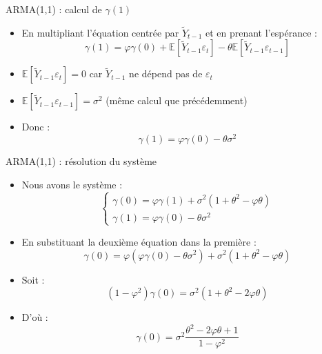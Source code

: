 \documentclass[11pt,aspectratio=169]{beamer}
\newcommand{\E}{\mathbb{E}}
\begin{document}
\begin{frame}{ARMA(1,1) : calcul de $\gamma(1)$}

\begin{itemize}

\item En multipliant l'équation centrée par $\tilde{Y}_{t-1}$ et en prenant l'espérance :
\[
\gamma(1) = \varphi \gamma(0) + \E[\tilde{Y}_{t-1} \varepsilon_t] - \theta \E[\tilde{Y}_{t-1} \varepsilon_{t-1}]
\]

\item $\E[\tilde{Y}_{t-1} \varepsilon_t] = 0$ car $\tilde{Y}_{t-1}$ ne dépend pas de $\varepsilon_t$\newline

\item $\E[\tilde{Y}_{t-1} \varepsilon_{t-1}] = \sigma^2$ (même calcul que précédemment)\newline

\item Donc :
\[
\boxed{\gamma(1) = \varphi \gamma(0) - \theta \sigma^2}
\]

\end{itemize}
\end{frame}

\begin{frame}{ARMA(1,1) : résolution du système}

\begin{itemize}

\item Nous avons le système :
\[
\begin{cases}
\gamma(0) = \varphi \gamma(1) + \sigma^2 (1 + \theta^2 - \varphi \theta) \\
\gamma(1) = \varphi \gamma(0) - \theta \sigma^2
\end{cases}
\]

\item En substituant la deuxième équation dans la première :
\[
\gamma(0) = \varphi (\varphi \gamma(0) - \theta \sigma^2) + \sigma^2 (1 + \theta^2 - \varphi \theta)
\]

\item Soit :
\[
(1 - \varphi^2) \gamma(0) = \sigma^2 (1 + \theta^2 - 2\varphi \theta)
\]

\item D'où :
\[
\boxed{\gamma(0) = \sigma^2 \frac{\theta^2 - 2\varphi\theta + 1}{1 - \varphi^2}}
\]

\end{itemize}
\end{frame}
\end{document}

